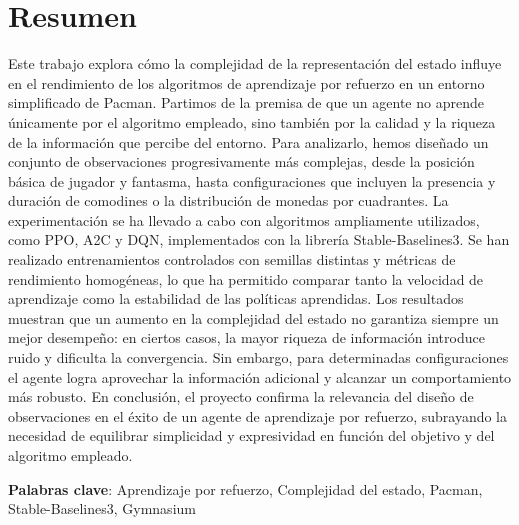
\chapter*{Resumen}

\onehalfspacing

Este trabajo explora cómo la complejidad de la representación del estado influye en el rendimiento de los algoritmos de aprendizaje por refuerzo en un entorno simplificado de Pacman. Partimos de la premisa de que un agente no aprende únicamente por el algoritmo empleado, sino también por la calidad y la riqueza de la información que percibe del entorno. Para analizarlo, hemos diseñado un conjunto de observaciones progresivamente más complejas, desde la posición básica de jugador y fantasma, hasta configuraciones que incluyen la presencia y duración de comodines o la distribución de monedas por cuadrantes.
La experimentación se ha llevado a cabo con algoritmos ampliamente utilizados, como PPO, A2C y DQN, implementados con la librería Stable-Baselines3. Se han realizado entrenamientos controlados con semillas distintas y métricas de rendimiento homogéneas, lo que ha permitido comparar tanto la velocidad de aprendizaje como la estabilidad de las políticas aprendidas.
Los resultados muestran que un aumento en la complejidad del estado no garantiza siempre un mejor desempeño: en ciertos casos, la mayor riqueza de información introduce ruido y dificulta la convergencia. Sin embargo, para determinadas configuraciones el agente logra aprovechar la información adicional y alcanzar un comportamiento más robusto.
En conclusión, el proyecto confirma la relevancia del diseño de observaciones en el éxito de un agente de aprendizaje por refuerzo, subrayando la necesidad de equilibrar simplicidad y expresividad en función del objetivo y del algoritmo empleado.


\vspace{1.5cm}

\textbf{Palabras clave}: Aprendizaje por refuerzo, Complejidad del estado, Pacman, Stable-Baselines3, Gymnasium